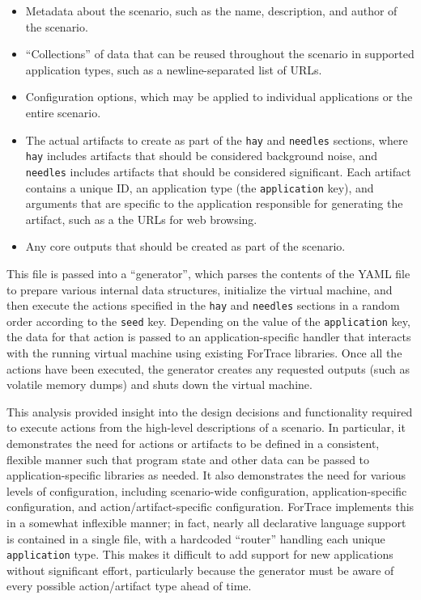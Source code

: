 \begin{itemize}
\tightlist
\item
  Metadata about the scenario, such as the name, description, and author
  of the scenario.
\item
  ``Collections'' of data that can be reused throughout the scenario in
  supported application types, such as a newline-separated list of URLs.
\item
  Configuration options, which may be applied to individual applications
  or the entire scenario.
\item
  The actual artifacts to create as part of the
  \passthrough{\lstinline!hay!} and \passthrough{\lstinline!needles!}
  sections, where \passthrough{\lstinline!hay!} includes artifacts that
  should be considered background noise, and
  \passthrough{\lstinline!needles!} includes artifacts that should be
  considered significant. Each artifact contains a unique ID, an
  application type (the \passthrough{\lstinline!application!} key), and
  arguments that are specific to the application responsible for
  generating the artifact, such as a the URLs for web browsing.\\
\item
  Any core outputs that should be created as part of the scenario.
\end{itemize}

This file is passed into a ``generator'', which parses the contents of
the YAML file to prepare various internal data structures, initialize
the virtual machine, and then execute the actions specified in the
\passthrough{\lstinline!hay!} and \passthrough{\lstinline!needles!}
sections in a random order according to the
\passthrough{\lstinline!seed!} key. Depending on the value of the
\passthrough{\lstinline!application!} key, the data for that action is
passed to an application-specific handler that interacts with the
running virtual machine using existing ForTrace libraries. Once all the
actions have been executed, the generator creates any requested outputs
(such as volatile memory dumps) and shuts down the virtual machine.

This analysis provided insight into the design decisions and
functionality required to execute actions from the high-level
descriptions of a scenario. In particular, it demonstrates the need for
actions or artifacts to be defined in a consistent, flexible manner such
that program state and other data can be passed to application-specific
libraries as needed. It also demonstrates the need for various levels of
configuration, including scenario-wide configuration,
application-specific configuration, and action/artifact-specific
configuration. ForTrace implements this in a somewhat inflexible manner;
in fact, nearly all declarative language support is contained in a
single file, with a hardcoded ``router'' handling each unique
\passthrough{\lstinline!application!} type. This makes it difficult to
add support for new applications without significant effort,
particularly because the generator must be aware of every possible
action/artifact type ahead of time.

